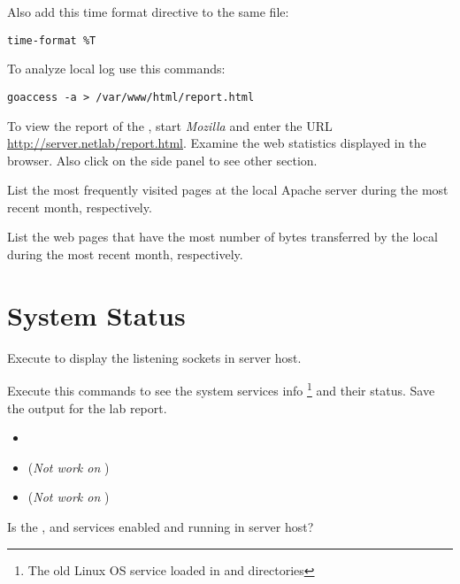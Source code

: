 \documentclass{../UTNetLab}
\begin{document}
Also add this time format directive to the same file:
\begin{lstlisting}
time-format %T
\end{lstlisting}

To analyze local log use this commands:
\begin{lstlisting}
goaccess -a > /var/www/html/report.html
    \end{lstlisting}

To view the report of the , start \textit{Mozilla} and enter the URL \url{http://server.netlab/report.html}.
Examine the web statistics displayed in the browser.
Also click on the side panel to see other section.

\begin{report}
    \item List the most frequently visited pages at the local Apache server during the most recent month, respectively.

    \item List the web pages that have the most number of bytes transferred by the local during the most recent month, respectively.
\end{report}

\section{System Status}
Execute  to display the listening sockets in server host.

Execute this commands to see the system services info \footnote{The old Linux OS service loaded in and  directories} and their status.
Save the output for the lab report.
\begin{itemize}
    \item {}
    \item {} (\textit{Not work on} )
    \item {} (\textit{Not work on} )
\end{itemize}

\begin{report}
    \item Is the ,  and  services enabled and running in server host?
\end{report}
\end{document}
